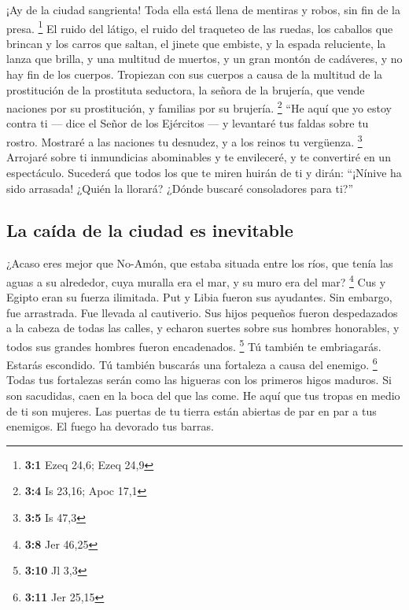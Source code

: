  ¡Ay de la ciudad sangrienta! Toda ella está llena de
mentiras y robos, sin fin de la presa. \footnote{\textbf{3:1} Ezeq 24,6;
  Ezeq 24,9}  El ruido del látigo, el ruido del traqueteo
de las ruedas, los caballos que brincan y los carros que saltan,
 el jinete que embiste, y la espada reluciente, la lanza
que brilla, y una multitud de muertos, y un gran montón de cadáveres, y
no hay fin de los cuerpos. Tropiezan con sus cuerpos  a
causa de la multitud de la prostitución de la prostituta seductora, la
señora de la brujería, que vende naciones por su prostitución, y
familias por su brujería. \footnote{\textbf{3:4} Is 23,16; Apoc 17,1}
 ``He aquí que yo estoy contra ti --- dice el Señor de los
Ejércitos --- y levantaré tus faldas sobre tu rostro. Mostraré a las
naciones tu desnudez, y a los reinos tu vergüenza. \footnote{\textbf{3:5}
  Is 47,3}  Arrojaré sobre ti inmundicias abominables y te
envileceré, y te convertiré en un espectáculo.  Sucederá
que todos los que te miren huirán de ti y dirán: ``¡Nínive ha sido
arrasada! ¿Quién la llorará? ¿Dónde buscaré consoladores para ti?''

\hypertarget{la-cauxedda-de-la-ciudad-es-inevitable}{%
\subsection{La caída de la ciudad es
inevitable}\label{la-cauxedda-de-la-ciudad-es-inevitable}}

 ¿Acaso eres mejor que No-Amón, que estaba situada entre
los ríos, que tenía las aguas a su alrededor, cuya muralla era el mar, y
su muro era del mar? \footnote{\textbf{3:8} Jer 46,25} 
Cus y Egipto eran su fuerza ilimitada. Put y Libia fueron sus ayudantes.
 Sin embargo, fue arrastrada. Fue llevada al cautiverio.
Sus hijos pequeños fueron despedazados a la cabeza de todas las calles,
y echaron suertes sobre sus hombres honorables, y todos sus grandes
hombres fueron encadenados. \footnote{\textbf{3:10} Jl 3,3}
 Tú también te embriagarás. Estarás escondido. Tú también
buscarás una fortaleza a causa del enemigo. \footnote{\textbf{3:11} Jer
  25,15}  Todas tus fortalezas serán como las higueras
con los primeros higos maduros. Si son sacudidas, caen en la boca del
que las come.  He aquí que tus tropas en medio de ti son
mujeres. Las puertas de tu tierra están abiertas de par en par a tus
enemigos. El fuego ha devorado tus barras.

